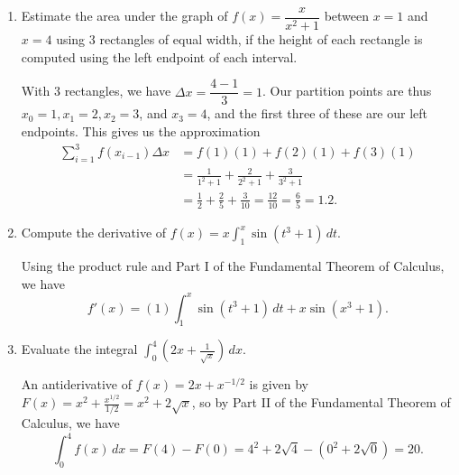 \documentclass[12pt]{article}
\newcommand{\points}[1]{\marginpar{\hspace{24pt}[#1]}}
\newcommand{\di}{\displaystyle}
\begin{document}
\begin{enumerate}
\newpage

\item Estimate the area under the graph of $f(x) = \dfrac{x}{x^2+1}$ between $x=1$ and $x=4$ using 3 rectangles of equal width, if the height of each rectangle is computed using the left endpoint of each interval. \points{3}

\bigskip

With 3 rectangles, we have $\Delta x = \dfrac{4-1}{3} = 1$. Our partition points are thus $x_0=1, x_1=2, x_2=3$, and $x_3=4$, and the first three of these are our left endpoints. This gives us the approximation
\begin{align*}
 \sum_{i=1}^3f(x_{i-1})\Delta x &= f(1)(1) +f(2)(1)+f(3)(1)\\
 & = \frac{1}{1^2+1}+\frac{2}{2^2+1}+\frac{3}{3^2+1}\\
 & = \frac{1}{2}+\frac{2}{5}+\frac{3}{10} = \frac{12}{10} = \frac{6}{5} = 1.2.
\end{align*}

\bigskip

\item Compute the derivative of $\di f(x) = x\int_1^{x} \sin(t^3+1)\,dt$. \points{2}

\bigskip

Using the product rule and Part I of the Fundamental Theorem of Calculus, we have
\[
 f'(x) = (1)\int_1^x\sin(t^3+1)\,dt + x\sin(x^3+1).
\]

\bigskip

\item Evaluate the integral $\di \int_0^4 \left(2x+\frac{1}{\sqrt{x}}\right)\,dx$. \points{3}

\bigskip

An antiderivative of $f(x)=2x+x^{-1/2}$ is given by $F(x)=x^2+\frac{x^{1/2}}{1/2} = x^2+2\sqrt{x}$, so by Part II of the Fundamental Theorem of Calculus, we have
\[
 \int_0^4f(x)\,dx = F(4)-F(0) = 4^2+2\sqrt{4}-(0^2+2\sqrt{0}) = 20.
\]

\end{enumerate}
\end{document}
